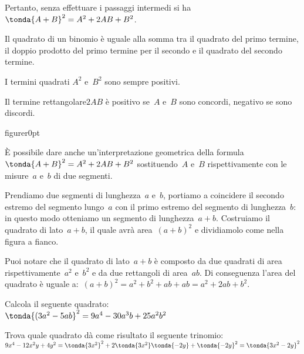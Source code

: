 Pertanto, senza effettuare i passaggi intermedi si 
ha~\(\tonda{A+B}^{2}=A^{2}+2{AB}+B^{2}\).

\osservazione 
Il quadrato di un binomio è
uguale alla somma tra il quadrato del primo termine, il doppio prodotto del 
primo termine per il secondo e il quadrato del secondo termine.

% 

\begin{enumeratea}
\item I termini quadrati \(A^{2}\) e~\(B^{2}\) sono sempre positivi.
\item Il termine rettangolare\(2AB\) è positivo se~\(A\) e~\(B\) sono 
concordi, negativo se sono discordi.
\end{enumeratea}

\begin{wrapfloat}{figure}{r}{0pt}
\scalebox{.6}{}
\end{wrapfloat}

È possibile dare anche
un'interpretazione geometrica della 
formula~\(\tonda{A+B}^{2}=A^{2}+2{AB}+B^{2}\)
sostituendo~\(A\) e~\(B\) rispettivamente con le misure~\(a\) e~\(b\)
di due segmenti.

Prendiamo due segmenti di lunghezza~\(a\) e~\(b\), portiamo a
coincidere il secondo estremo del segmento lungo~\(a\) con il
primo estremo del segmento di lunghezza~\(b\): in questo modo
otteniamo un segmento di lunghezza~\(a+b\). Costruiamo il quadrato di
lato~\(a+b\), il quale avrà area~\((a+b)^{2}\) e dividiamolo come
nella figura a fianco.

Puoi notare che il quadrato di lato~\(a+b\) è composto da due quadrati
di area rispettivamente~\(a^{2}\) e~\(b^{2}\) e
da due rettangoli di area~\(ab\). Di conseguenza
l'area del quadrato è uguale 
a:~\((a+b)^{2}=a^{2}+b^{2}+{ab}+{ab}=a^{2}+2{ab}+b^{2}\).

\begin{esempio} Calcola il seguente quadrato:\\
\(\tonda{(3a^2-5ab}^2 = 9a^4 - 30 a^3 b + 25a^2 b^2\)
\end{esempio}

\begin{esempio} Trova quale quadrato dà come risultato il seguente 
trinomio:\\
\(9x^4 - 12 x^2 y + 4y^2= 
\tonda{3x^2}^2 +2\tonda{3x^2}\tonda{-2y}+\tonda{-2y}^2=
\tonda{3x^2-2y}^2\)
\end{esempio}

